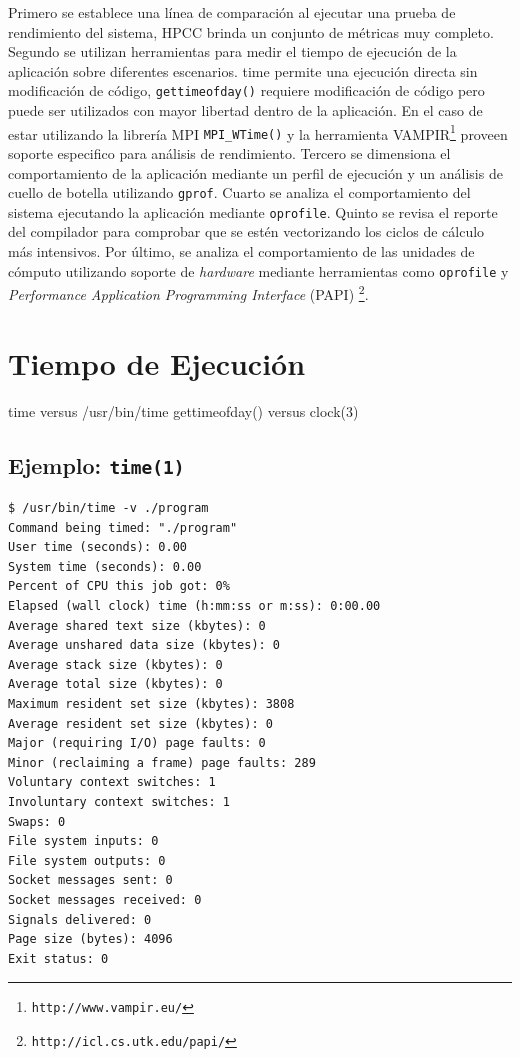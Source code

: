 \documentclass[a4paper]{report}
\begin{document}
Primero se establece una línea de comparación al ejecutar una prueba de rendimiento del sistema, HPCC brinda un conjunto de métricas muy completo. Segundo se utilizan herramientas para medir el tiempo de ejecución de la aplicación sobre diferentes escenarios. time permite una ejecución directa sin modificación de código, {\tt gettimeofday()} requiere modificación de código pero puede ser utilizados con mayor libertad dentro de la aplicación.  
En el caso de estar utilizando la librería MPI {\tt MPI\_WTime()} y la herramienta VAMPIR\footnote{\tt http://www.vampir.eu/} proveen soporte especifico para análisis de rendimiento.
Tercero se dimensiona el comportamiento de la aplicación mediante un perfil de ejecución y un análisis de cuello de botella utilizando {\tt gprof}. Cuarto se analiza el comportamiento del sistema ejecutando la aplicación mediante {\tt oprofile}. Quinto se revisa el reporte del compilador para comprobar que se estén vectorizando los ciclos de cálculo más intensivos. Por último, se analiza el comportamiento de las unidades de cómputo utilizando soporte de {\it hardware} mediante herramientas como {\tt oprofile} y {\it Performance Application Programming Interface} (PAPI) \footnote{\tt http://icl.cs.utk.edu/papi/}.

\section{Tiempo de Ejecución}

time versus /usr/bin/time
gettimeofday() versus clock(3)

\subsection{Ejemplo: {\tt time(1)}}

\begin{lstlisting} 
$ /usr/bin/time -v ./program
Command being timed: "./program"
User time (seconds): 0.00
System time (seconds): 0.00
Percent of CPU this job got: 0%
Elapsed (wall clock) time (h:mm:ss or m:ss): 0:00.00
Average shared text size (kbytes): 0
Average unshared data size (kbytes): 0
Average stack size (kbytes): 0
Average total size (kbytes): 0
Maximum resident set size (kbytes): 3808
Average resident set size (kbytes): 0
Major (requiring I/O) page faults: 0
Minor (reclaiming a frame) page faults: 289
Voluntary context switches: 1
Involuntary context switches: 1
Swaps: 0
File system inputs: 0
File system outputs: 0
Socket messages sent: 0
Socket messages received: 0
Signals delivered: 0
Page size (bytes): 4096
Exit status: 0
\end{lstlisting}
\end{document}
